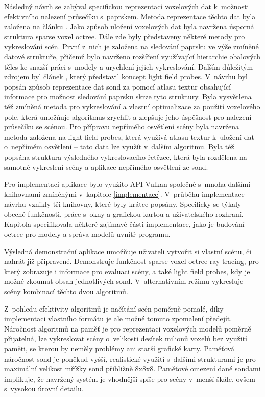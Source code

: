 Následný návrh se zabýval specifickou reprezentací voxelových dat k~možnosti efektivního nalezení průsečíku s~paprskem. Metoda reprezentace těchto dat byla založena na článku \cite{Laine2011EfficientSV}. Jako způsob uložení voxelových dat byla navržena úsporná struktura sparse voxel octree. Dále zde byly představeny některé metody pro vykreslování scén. První z~nich je založena na sledování paprsku ve výše zmíněné datové struktuře, přičemž bylo navrženo rozšíření využívající hierarchie obalových těles ke snazší práci s~modely a urychlení jejich vykreslování. Dalším důležitým zdrojem byl článek \cite{light_field_probes}, který představil koncept light field probes. V~návrhu byl popsán způsob reprezentace dat sond za pomocí atlasu textur obsahující informace pro možnost sledování paprsku skrze tyto struktury. Byla vysvětlena též zmíněná metoda pro vykreslování a vlastní optimalizace za použití voxelového pole, která umožňuje algoritmus zrychlit a zlepšuje jeho úspěšnost pro nalezení průsečíku se scénou. Pro přípravu nepřímého osvětlení scény byla navržena metoda založena na light field probes, která využívá atlasu textur k~uložení dat o~nepřímém osvětlení -- tato data lze využít v~dalším algoritmu. Byla též popsána struktura výsledného vykreslovacího řetězce, která byla rozdělena na samotné vykreslení scény a aplikace nepřímého osvětlení ze sond.

Pro implementaci aplikace bylo využito API Vulkan společně s~mnoha dalšími knihovnami zmíněnými v~kapitole \ref{implementace}. V~průběhu implementace návrhu vznikly tři knihovny, které byly krátce popsány. Specificky se týkaly obecné funkčnosti, práce s~okny a grafickou kartou a uživatelského rozhraní. Kapitola specifikovala některé zajímavé části implementace, jako je budování octree pro modely a správa modelů uvnitř programu.

Výsledná demonstrační aplikace umožňuje uživateli vytvořit si vlastní scénu, či nahrát již připravené. Demonstruje funkčnost sparse voxel octree ray tracing, pro který zobrazuje i informace pro evaluaci scény, a také light field probes, kdy je možné zkoumat obsah jednotlivých sond. V~alternativním režimu vykresluje scény kombinací těchto dvou algoritmů.

Z~pohledu efektivity algoritmů je načítání scén poměrně pomalé, díky implementaci vlastního formátu je ale možné tomuto zpomalení předejít. Náročnost algoritmů na paměť je pro reprezentaci voxelových modelů poměrně přijatelná, lze vykreslovat scény o~velikosti desítek milionů voxelů bez využití paměti, se kterou by neměly problémy ani starší grafické karty. Paměťová náročnost sond je poněkud vyšší, realistické využití s~dalšími strukturami je pro maximální velikost mřížky sond přibližně 8x8x8. Paměťové omezení dané sondami implikuje, že navržený systém je vhodnější spíše pro scény v~menší škále, ovšem s~vysokou úrovní detailu.



